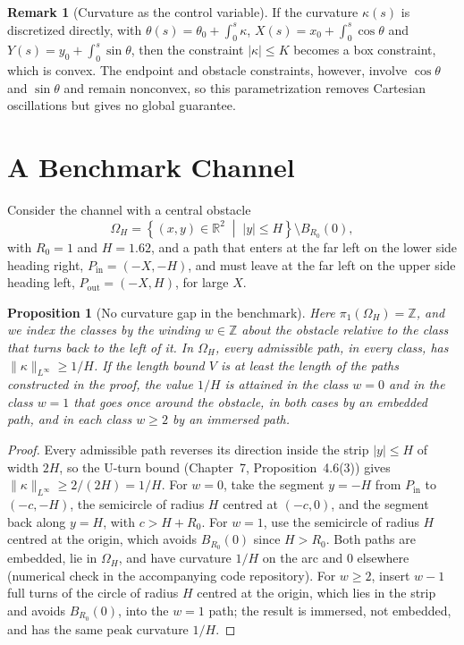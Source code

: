 \documentclass[11pt,reqno]{amsart}
\newtheorem{proposition}[theorem]{Proposition}
\theoremstyle{definition}
\newtheorem{remark}[theorem]{Remark}
\newcommand{\Z}{\mathbb{Z}}
\numberwithin{equation}{section}
\providecommand{\xref}[2]{#2}
\begin{document}
\begin{remark}[Curvature as the control variable]
If the curvature $\kappa(s)$ is discretized directly, with $\theta(s) = \theta_0 + \int_0^s \kappa$, $X(s) = x_0 + \int_0^s \cos\theta$ and $Y(s) = y_0 + \int_0^s\sin\theta$, then the constraint $|\kappa| \le K$ becomes a box constraint, which is convex. The endpoint and obstacle constraints, however, involve $\cos\theta$ and $\sin\theta$ and remain nonconvex, so this parametrization removes Cartesian oscillations but gives no global guarantee.
\end{remark}

\section{A Benchmark Channel}
\label{sec:benchmark}

Consider the channel with a central obstacle
\begin{equation}
\Omega_H = \left\{ (x, y) \in \mathbb{R}^2 \;\middle|\; |y| \le H \right\} \setminus B_{R_0}(0),
\end{equation}
with $R_0 = 1$ and $H = 1.62$, and a path that enters at the far left on the lower side heading right, $P_{\mathrm{in}} = (-X, -H)$, and must leave at the far left on the upper side heading left, $P_{\mathrm{out}} = (-X, H)$, for large $X$.

\begin{proposition}[No curvature gap in the benchmark]
\label{prop:corridor_gap}
Here $\pi_1(\Omega_H) = \Z$, and we index the classes by the winding $w \in \Z$ about the obstacle relative to the class that turns back to the left of it. In $\Omega_H$, every admissible path, in every class, has $\|\kappa\|_{L^\infty} \ge 1/H$. If the length bound $V$ is at least the length of the paths constructed in the proof, the value $1/H$ is attained in the class $w = 0$ and in the class $w = 1$ that goes once around the obstacle, in both cases by an \emph{embedded} path, and in each class $w \ge 2$ by an immersed path.
\end{proposition}

\begin{proof}
Every admissible path reverses its direction inside the strip $|y| \le H$ of width $2H$, so the U-turn bound (Chapter~7, Proposition~\xref{chap07:thm:lower_bounds}{4.6}(3)) gives $\|\kappa\|_{L^\infty} \ge 2/(2H) = 1/H$. For $w = 0$, take the segment $y = -H$ from $P_{\mathrm{in}}$ to $(-c, -H)$, the semicircle of radius $H$ centred at $(-c, 0)$, and the segment back along $y = H$, with $c > H + R_0$. For $w = 1$, use the semicircle of radius $H$ centred at the origin, which avoids $B_{R_0}(0)$ since $H > R_0$. Both paths are embedded, lie in $\Omega_H$, and have curvature $1/H$ on the arc and $0$ elsewhere (numerical check in the accompanying code repository). For $w \ge 2$, insert $w-1$ full turns of the circle of radius $H$ centred at the origin, which lies in the strip and avoids $B_{R_0}(0)$, into the $w = 1$ path; the result is immersed, not embedded, and has the same peak curvature $1/H$.
\end{proof}
\end{document}
